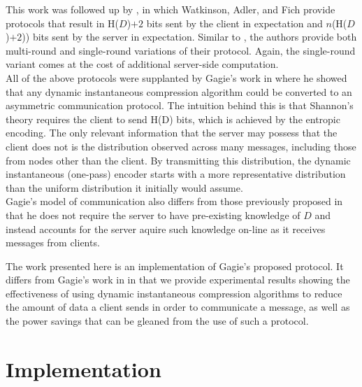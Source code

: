 \documentclass[conference]{IEEEtran}
\begin{document}
This work was followed up by \cite{Watkinson01}, in which Watkinson,
Adler, and Fich provide protocols that result in H($D$)$ + 2$ bits
sent by the client in expectation and $n$(H($D$)$ + 2$)) bits sent by
the server in expectation.  Similar to \cite{Adler98}, the authors
provide both multi-round and single-round variations of their
protocol.  Again, the single-round variant comes at the cost of
additional server-side computation.\\

All of the above protocols were supplanted by Gagie's work in
\cite{Gagie06} where he showed that any dynamic instantaneous
compression algorithm could be converted to an asymmetric
communication protocol.  The intuition behind this is that Shannon's
theory requires the client to send H(D) bits, which is achieved by the
entropic encoding.  The only relevant information that the server may possess
that the client does not is the distribution observed across many
messages, including those from nodes other than the client.  By
transmitting this distribution, the dynamic instantaneous (one-pass)
encoder starts with a more representative distribution than the
uniform distribution it initially would assume.\\

Gagie's model of communication also differs from those previously
proposed in that he does not require the server to have pre-existing
knowledge of $D$ and instead accounts for the server aquire such
knowledge on-line as it receives messages from clients.

The work presented here is an implementation of Gagie's proposed
protocol.  It differs from Gagie's work in \cite{Gagie06} in that we
provide experimental results showing the effectiveness of using
dynamic instantaneous compression algorithms to reduce the amount of
data a client sends in order to communicate a message, as well as the
power savings that can be gleaned from the use of such a protocol.

\section{Implementation}




\end{document}
